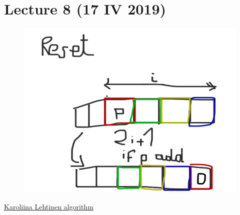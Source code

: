 \section{Lecture 8 (17 IV 2019)}
\begin{figure}[H]
    \centering
    \includegraphics[scale=0.2]{content/graphics/game7.png}
\end{figure}
\href{https://dl.acm.org/ft_gateway.cfm?id=3209115&ftid=1982453&dwn=1&CFID=123825150&CFTOKEN=83e223cdf7d5823a-A4DA4330-AB4A-563D-5D3314A8B85B927F}{Karoliina Lehtinen algorithm}
